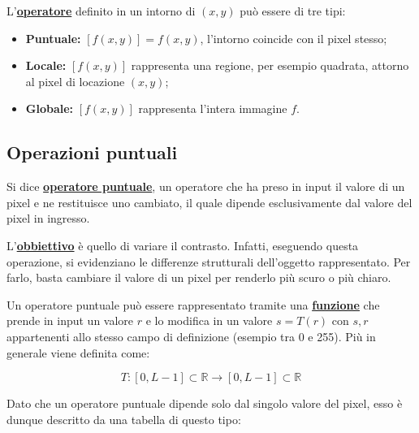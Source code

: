 \documentclass[a4paper]{article}
\begin{document}
	\noindent
	L'\textcolor{Red3}{\textbf{\underline{operatore}}} definito in un intorno di $\left(x,y\right)$ può essere di tre tipi:
	
	\begin{itemize}
		\item \textbf{Puntuale:} $\left[f\left(x,y\right)\right] = f\left(x,y\right)$, l'intorno coincide con il pixel stesso;
		
		\item \textbf{Locale:} $\left[f\left(x,y\right)\right]$ rappresenta una regione, per esempio quadrata, attorno al pixel di locazione $\left(x,y\right)$;
		
		\item \textbf{Globale:} $\left[f\left(x,y\right)\right]$ rappresenta l'intera immagine $f$.
	\end{itemize}

	\newpage
	
	\subsection{Operazioni puntuali}
	
	Si dice \textcolor{Red3}{\textbf{\underline{operatore puntuale}}}, un operatore che ha preso in input il valore di un pixel e ne restituisce uno cambiato, il quale dipende esclusivamente dal valore del pixel in ingresso.\newline
	
	\noindent
	L'\textbf{\underline{obbiettivo}} è quello di variare il contrasto. Infatti, eseguendo questa operazione, si evidenziano le differenze strutturali dell'oggetto rappresentato. Per farlo, basta cambiare il valore di un pixel per renderlo più scuro o più chiaro.\newline
	
	\noindent
	Un operatore puntuale può essere rappresentato tramite una \textbf{\underline{funzione}} che prende in input un valore $r$ e lo modifica in un valore $s = T\left(r\right)$ con $s,r$ appartenenti allo stesso campo di definizione (esempio tra 0 e 255). Più in generale viene definita come:
	
	\begin{equation*}
		T: \left[0, L - 1\right] \subset \mathbb{R} \longrightarrow \left[0, L - 1\right] \subset \mathbb{R}
	\end{equation*}

	\noindent
	Dato che un operatore puntuale dipende solo dal singolo valore del pixel, esso è dunque descritto da una tabella di questo tipo:
	
\end{document}

